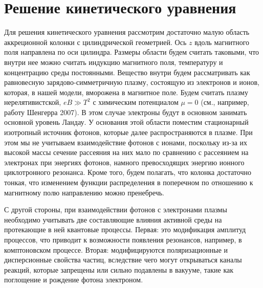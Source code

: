 \documentclass{pazh2col-win}
\begin{document}

\section{Решение кинетического уравнения}
\label{section_A}

Для решения кинетического уравнения рассмотрим достаточно малую область аккреционной колонки с цилиндрической геометрией. Ось $z$ вдоль магнитного поля  направлена по оси цилиндра. Размеры области будем считать таковыми, что внутри нее можно считать индукцию магнитного поля, температуру и концентрацию среды постоянными. Вещество внутри будем рассматривать как равновесную зарядово-симметричную плазму, состоящую из электронов и ионов, которая, в нашей модели, вморожена в магнитное поле. Будем считать плазму нерелятивистской, $eB \gg T^2$ с химическим потенциалом $\mu = 0$ (см., например, работу Шенгерра 2007). В этом случае электроны будут в основном занимать основной уровень Ландау. У основания этой области поместим стационарный изотропный источник фотонов, которые далее распространяются в плазме. При этом мы не учитываем взаимодействие фотонов с ионами, поскольку из-за их высокой массы сечение рассеяния на них мало по сравнению с рассеянием на электронах при энергиях фотонов, намного превосходящих энергию ионного циклотронного резонанса. Кроме того, будем полагать, что колонка достаточно тонкая, что изменением функции распределения в поперечном по отношению к магнитному полю направлению можно пренебречь.

С другой стороны, при взаимодействии фотонов с электронами плазмы необходимо учитывать две составляющие влияния активной среды на протекающие в ней квантовые процессы. Первая: это модификация амплитуд процессов, что приводит к возможности появления резонансов, например, в комптоновском процессе. Вторая: модифицируются поляризационные и дисперсионные свойства частиц, вследствие чего могут открываться каналы реакций, которые запрещены или сильно подавлены в вакууме, такие как поглощение и рождение фотона электроном.
\end{document}
